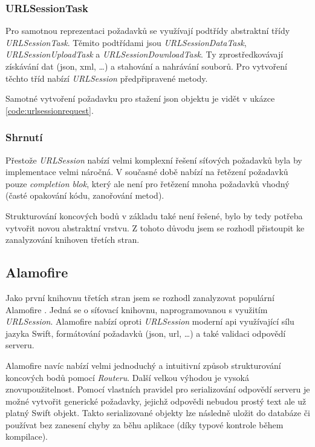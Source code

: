 
\subsubsection*{URLSessionTask}

Pro samotnou reprezentaci požadavků se využívají podtřídy abstraktní třídy \textit{URLSessionTask}.
Těmito podtřídami jsou \textit{URLSessionDataTask}, \textit{URLSessionUploadTask} a \textit{URLSessionDownloadTask}.
Ty zprostředkovávají získávání dat (\acrshort{json}, \acrshort{xml}, \ldots) a stahování a nahrávání souborů.
Pro vytvoření těchto tříd nabízí \textit{URLSession} předpřipravené metody.

Samotné vytvoření požadavku pro stažení \acrshort{json} objektu je vidět v ukázce \ref{code:urlsessionrequest}.


\subsubsection*{Shrnutí}

Přestože \textit{URLSession} nabízí velmi komplexní řešení síťových požadavků byla by implementace velmi náročná.
V současné době nabízí na řetězení požadavků pouze \textit{completion blok}, který ale není pro řetězení mnoha požadavků vhodný (časté opakování kódu, zanořování metod).

Strukturování koncových bodů v základu také není řešené, bylo by tedy potřeba vytvořit novou abstraktní vrstvu.
Z tohoto důvodu jsem se rozhodl přistoupit ke zanalyzování knihoven třetích stran.

\subsection{Alamofire}

Jako první knihovnu třetích stran jsem se rozhodl zanalyzovat populární Alamofire \cite{github-alamofire}.
Jedná se o síťovací knihovnu, naprogramovanou s využitím \textit{URLSession}.
Alamofire nabízí oproti \textit{URLSession} moderní \acrshort{api} využívající sílu jazyka Swift, formátování požadavků (\acrshort{json}, \acrshort{url}, \ldots) a také validaci odpovědí serveru.

Alamofire navíc nabízí velmi jednoduchý a intuitivní způsob strukturování koncových bodů pomocí \textit{Routeru}.
Další velkou výhodou je vysoká znovupoužitelnost.
Pomocí vlastních pravidel pro serializování odpovědí serveru je možné vytvořit generické požadavky, jejichž odpovědi nebudou prostý text ale už platný Swift objekt.
Takto serializované objekty lze následně uložit do databáze či používat bez zanesení chyby za běhu aplikace (díky typové kontrole během kompilace).


